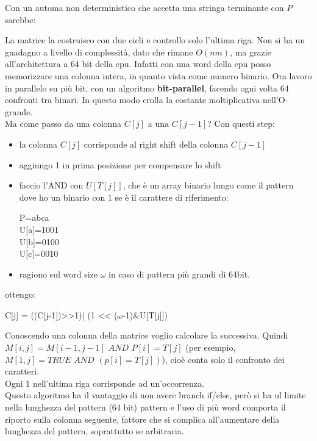 \documentclass[a4paper,12pt, oneside]{book}
\begin{document}
Con un automa non deterministico che accetta una stringa terminante
con $P$ sarebbe:
\begin{center}
\end{center}
La matrice la costruisco con due cicli e controllo solo l'ultima riga.
Non si ha un guadagno a livello di complessità, dato che rimane
$O(nm)$, ma grazie all'architettura a 64 bit della cpu. Infatti con una word
della cpu posso memorizzare una colonna intera, in quanto vista come numero
binario. Ora lavoro in parallelo su più bit, con un algoritmo
\textbf{bit-parallel}, facendo ogni volta 64 confronti tra binari. In
questo modo crolla la costante moltiplicativa nell'O-grande.\\
Ma come passo da una colonna $C[j]$ a una $C[j-1]$? Con questi step:
\begin{itemize}
  \item la colonna $C[j]$ corrisponde al right shift della colonna $C[j-1]$
  \item aggiungo 1 in prima posizione per compensare lo shift
  \item faccio l'AND con $U[T[j]]$, che è un array binario lungo come
  il pattern dove ho un binario con 1 se è il carattere  di
  riferimento:
  \begin{center}
    P=abca\\
    U[a]=1001\\
    U[b]=0100\\
    U[c]=0010\\
  \end{center}
  \item ragiono sul word size $\omega$ in caso di pattern più grandi
  di 64bit.
\end{itemize}
ottengo:
\begin{center}
  C[j] = ((C[j-1])>>1)| (1 << ($\omega$-1)\&U[T[j]])
\end{center}
Conoscendo una colonna della matrice voglio calcolare la successiva. 
Quindi $M[i,j]=M[i-1,j-1]\,\,AND\,\,P[i]=T[j]$ (per esempio, 
$M[1,j]=TRUE\,\,AND\,\,(p[i]=T[j])$), cioè conta solo il
confronto dei caratteri. \\
Ogni 1 nell'ultima riga corrisponde ad un'occorrenza. \\ 
Questo algoritmo ha il vantaggio di non avere branch if/else, 
però si ha ul limite nella lunghezza del pattern (64 bit) pattern 
e l'uso di più word comporta il riporto sulla colonna
seguente, fattore che si complica all'aumentare della lunghezza del
pattern, soprattutto se arbitraria.
\end{document}
